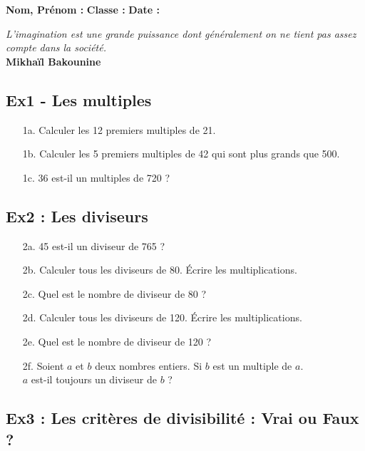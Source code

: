 



\textbf{Nom, Prénom :} \hspace{8cm} \textbf{Classe :} \hspace{3cm} \textbf{Date :}\\

\begin{center}
  \textit{L’imagination est une grande puissance dont généralement on ne tient pas assez compte dans la société.} \\ 
  \textbf{Mikhaïl Bakounine}
\end{center}

\subsection*{Ex1 - Les multiples}

\begin{enumerate}
  \item[1a.] Calculer les 12 premiers multiples de 21.
  \item[1b.] Calculer les 5 premiers multiples de 42 qui sont plus grands que 500.
  \item[1c.] 36 est-il un multiples de 720 ?
\end{enumerate}

\subsection*{Ex2 : Les diviseurs}

\begin{enumerate}
  \item[2a.] 45 est-il un diviseur de 765 ?
  \item[2b.] Calculer tous les diviseurs de 80. Écrire les multiplications. 
  \item[2c.] Quel est le nombre de diviseur de 80 ?
  \item[2d.] Calculer tous les diviseurs de 120. Écrire les multiplications. 
  \item[2e.] Quel est le nombre de diviseur de 120 ?
  \item[2f.] Soient $a$ et $b$ deux nombres entiers. Si $b$ est un multiple de $a$. \\
   $a$ est-il toujours un diviseur de $b$ ?
\end{enumerate}

\subsection*{Ex3 : Les critères de divisibilité : Vrai ou Faux ?}

